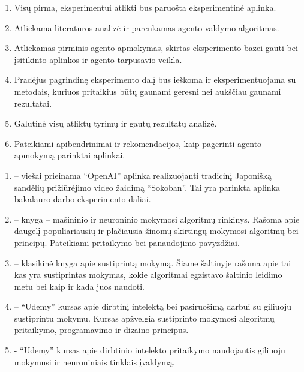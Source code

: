 \documentclass{VUMIFPSbakalaurinis}
\begin{document}
\begin{enumerate}
	\item Visų pirma, eksperimentui atlikti bus paruošta eksperimentinė aplinka.
	\item Atliekama literatūros analizė ir parenkamas agento valdymo algoritmas.
	\item Atliekamas pirminis agento apmokymas, skirtas eksperimento bazei gauti bei įsitikinto aplinkos ir agento tarpusavio veikla. 
	\item Pradėjus pagrindinę eksperimento dalį bus ieškoma ir eksperimentuojama su metodais, kuriuos pritaikius būtų gaunami geresni nei aukščiau gaunami rezultatai.
	\item Galutinė visų atliktų tyrimų ir gautų rezultatų analizė.
	\item Pateikiami apibendrinimai ir rekomendacijos, kaip pagerinti agento apmokymą parinktai aplinkai.
\end{enumerate}



\begin{enumerate}
	\item \textbf{\cite{gym}} -- viešai prieinama \enquote{OpenAI} \cite{openai} aplinka realizuojanti tradicinį Japonišką sandėlių prižiūrėjimo video žaidimą \enquote{Sokoban}. Tai yra parinkta aplinka bakalauro darbo eksperimento daliai.
	\item \textbf{\cite{handson}} -- knyga -- mašininio ir neuroninio mokymosi algoritmų rinkinys. Rašoma apie daugelį populiariausių ir plačiausia žinomų skirtingų mokymosi algoritmų bei principų. Pateikiami pritaikymo bei panaudojimo pavyzdžiai.
	\item \textbf{\cite{algorithms}} -- klasikinė knyga apie sustiprintą mokymą. Šiame šaltinyje rašoma apie tai kas yra sustiprintas mokymas, kokie algoritmai egzistavo šaltinio leidimo metu bei kaip ir kada juos naudoti.
	\item \textbf{\cite{udemy1}} -- \enquote{Udemy} \cite{udemy} kursas apie dirbtinį intelektą bei pasiruošimą darbui su giliuoju sustiprintu mokymu. Kursas apžvelgia sustiprinto mokymosi algoritmų pritaikymo, programavimo ir dizaino principus.
	\item \textbf{\cite{udemy2}} - \enquote{Udemy} \cite{udemy} kursas apie dirbtinio intelekto pritaikymo naudojantis giliuoju mokymusi ir neuroniniais tinklais įvaldymą.	
\end{enumerate}

\printbibliography[heading=bibintoc] 
\end{document}
